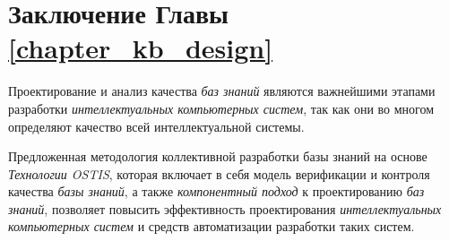 \section*{Заключение Главы \ref{chapter_kb_design}}
\label{kb_design_conclusion}

Проектирование и анализ качества \textit{баз знаний} являются важнейшими этапами разработки \textit{интеллектуальных компьютерных систем}, так как они во многом определяют качество всей интеллектуальной системы.

Предложенная методология коллективной разработки базы знаний на основе \textit{Технологии OSTIS}, которая включает в себя модель верификации и контроля качества \textit{базы знаний}, а также \textit{компонентный подход} к проектированию \textit{баз знаний}, позволяет повысить эффективность проектирования \textit{интеллектуальных компьютерных систем} и средств автоматизации разработки таких систем.
%
